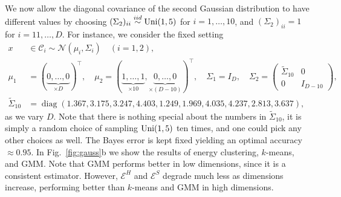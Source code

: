 \documentclass[aps,preprint,nofootinbib,floatfix]{revtex4-1}
\DeclareMathOperator{\diag}{diag}
\newcommand\C{{\mathcal{C}}}
\begin{document}
We now allow the diagonal covariance of the second Gaussian distribution to
have different values by choosing
$(\Sigma_2)_{ii} \stackrel{iid}{\sim} \textnormal{Uni}(1,5)$ for
$i=1,\dotsc,10$, and $(\Sigma_2)_{ii} = 1$ for $i=11,\dotsc,D$. For instance,
we consider the fixed setting
\begin{equation}
\label{eq:gauss2}
\begin{split}
x & \in \C_i  \sim 
\mathcal{N}(\mu_i,\Sigma_i) \quad (i=1,2),  \\
\mu_1 &= (\underbrace{0,\dotsc,0}_{\times D})^\top , \quad
\mu_2 = (\underbrace{1,\dots,1}_{\times 10},
\underbrace{0,\dots,0}_{\times (D-10)})^\top, \quad
\Sigma_1 = I_D, \quad
\Sigma_2 = \left( \begin{array}{c|c}
\widetilde{\Sigma}_{10} & 0 \\ \hline 
0 & I_{D-10} \end{array}\right), \\
\widetilde{\Sigma}_{10} &= \diag(1.367,  3.175,  3.247,  4.403,  1.249,
1.969, 4.035,   4.237,  2.813,  3.637),
\end{split}
\end{equation}
as we vary $D$. Note that there is nothing special about the numbers in
$\widetilde{\Sigma}_{10}$, it is simply a random choice of sampling
$\textnormal{Uni}(1,5)$ ten times, and one could pick any other choices
as well.
The Bayes error is kept fixed yielding
an optimal accuracy $\approx 0.95$.
In Fig.~\ref{fig:gauss}b we show the results of energy clustering,
$k$-means, and GMM.
Note that GMM performs better in low dimensions, 
since it is a consistent estimator.
However, $\mathcal{E}^H$ and $\mathcal{E}^S$ degrade much less as dimensions
increase, performing better than $k$-means and GMM in high dimensions.
 
\end{document}
